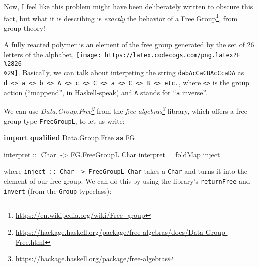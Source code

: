 \documentclass[]{article}
\newenvironment{Shaded}{}{}
\newcommand{\CommentTok}[1]{\textcolor[rgb]{0.38,0.63,0.69}{\textit{#1}}}
\newcommand{\DataTypeTok}[1]{\textcolor[rgb]{0.56,0.13,0.00}{#1}}
\newcommand{\FunctionTok}[1]{\textcolor[rgb]{0.02,0.16,0.49}{#1}}
\newcommand{\KeywordTok}[1]{\textcolor[rgb]{0.00,0.44,0.13}{\textbf{#1}}}
\newcommand{\NormalTok}[1]{#1}
\newcommand{\OtherTok}[1]{\textcolor[rgb]{0.00,0.44,0.13}{#1}}
\renewcommand{\href}[2]{#2\footnote{\url{#1}}}
\begin{document}
Now, I feel like this problem might have been deliberately written to obscure
this fact, but what it is describing is \emph{exactly} the behavior of a
\href{https://en.wikipedia.org/wiki/Free_group}{Free Group}, from group theory!

A fully reacted polymer is an element of the free group generated by the set of
26 letters of the alphabet,
\texttt{[image: https://latex.codecogs.com/png.latex?F\\\%2826\\\%29]}. Basically,
we can talk about interpeting the string \texttt{dabAcCaCBAcCcaDA} as
\texttt{d\ \textless{}\textgreater{}\ a\ \textless{}\textgreater{}\ b\ \textless{}\textgreater{}\ A\ \textless{}\textgreater{}\ c\ \textless{}\textgreater{}\ C\ \textless{}\textgreater{}\ a\ \textless{}\textgreater{}\ C\ \textless{}\textgreater{}\ B\ \textless{}\textgreater{}\ etc.},
where \texttt{\textless{}\textgreater{}} is the group action (``mappend'', in
Haskell-speak) and \texttt{A} stands for ``\texttt{a} inverse''.

We can use
\emph{\href{https://hackage.haskell.org/package/free-algebras/docs/Data-Group-Free.html}{Data.Group.Free}}
from the
\emph{\href{https://hackage.haskell.org/package/free-algebras}{free-algebras}}
library, which offers a free group type \texttt{FreeGroupL}, to let us write:

\begin{Shaded}
\begin{Highlighting}[]
\KeywordTok{import} \KeywordTok{qualified} \DataTypeTok{Data.Group.Free} \KeywordTok{as} \DataTypeTok{FG}

\OtherTok{interpret ::}\NormalTok{ [}\DataTypeTok{Char}\NormalTok{] }\OtherTok{->} \DataTypeTok{FG.FreeGroupL} \DataTypeTok{Char}
\NormalTok{interpret }\FunctionTok{=}\NormalTok{ foldMap inject}
\end{Highlighting}
\end{Shaded}

where \texttt{inject\ ::\ Char\ -\textgreater{}\ FreeGroupL\ Char} takes a
\texttt{Char} and turns it into the element of our free group. We can do this by
using the library's \texttt{returnFree} and \texttt{invert} (from the
\texttt{Group} typeclass):

\begin{Shaded}
\end{Shaded}
\end{document}
